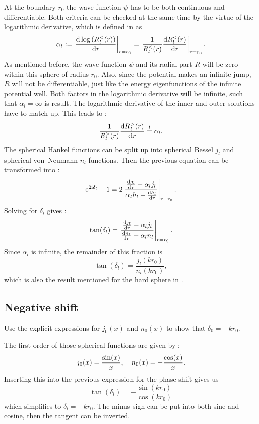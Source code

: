\documentclass[11pt, english, fleqn, DIV=15, headinclude, BCOR=1.5cm]{scrartcl}
\begin{document}
At the boundary $r_0$ the wave function $\psi$ has to be both continuous and
differentiable. Both criteria can be checked at the same time by the virtue of
the logarithmic derivative, which is defined in
\parencite[(18.60)]{Schwabl/Quantenmechanik} as
\[
    \alpha_l := \left. \frac{\mathop{}\!\mathrm d {\,\log\left( R_l^<(r) \right)}}{\mathop{}\!\mathrm d {r}} \right|_{r = r_0}
    = \left. \frac{1}{R_l^<(r)} \frac{\mathop{}\!\mathrm d {R_l^<(r)}}{\mathop{}\!\mathrm d {r}} \right|_{r = r_0}.
\]
As mentioned before, the wave function $\psi$ and its radial part $R$ will be
zero within this sphere of radius $r_0$. Also, since the potential makes an
infinite jump, $R$ will not be differentiable, just like the energy
eigenfunctions of the infinite potential well. Both factors in the logarithmic
derivative will be infinite, such that $\alpha_l = \infty$ is result. The
logarithmic derivative of the inner and outer solutions have to match up. This
leads to \parencite[(18.61)]{Schwabl/Quantenmechanik}:
\[
    \frac{1}{R_l^>(r)} \frac{\mathop{}\!\mathrm d {R_l^>(r)}}{\mathop{}\!\mathrm d {r}} \overset != \alpha_l.
\]
The spherical Hankel functions can be split up into spherical Bessel $j_l$ and
spherical von~Neumann $n_l$ functions. Then the previous equation can be
transformed into \parencite[(18.62)]{Schwabl/Quantenmechanik}:
\[
    \mathrm e^{2 \mathrm i \delta_l} -1 = 2 \left. \frac{\frac{\mathop{}\!\mathrm d {j_l}}{\mathop{}\!\mathrm d {r}} - \alpha_l j_l}{\alpha_l h_l
    - \frac{\mathop{}\!\mathrm d {h_l}}{\mathop{}\!\mathrm d {r}}} \right|_{r=r_0}.
\]
Solving for $\delta_l$ gives \parencite[(18.62)]{Schwabl/Quantenmechanik}:
\[
    \tan(\delta_l) = \left. \frac{\frac{\mathop{}\!\mathrm d {j_l}}{\mathop{}\!\mathrm d {r}} - \alpha_l j_l}{\frac{\mathop{}\!\mathrm d {n_l}}{\mathop{}\!\mathrm d {r}} - \alpha_l
    n_l} \right|_{r=r_0}.
\]
Since $\alpha_l$ is infinite, the remainder of this fraction is
\[
    \tan(\delta_l) = \frac{j_l(kr_0)}{n_l(kr_0)},
\]
which is also the result mentioned for the hard sphere in
\parencite[(18.63)]{Schwabl/Quantenmechanik}.

\subsection{Negative shift}

\begin{problem}
    Use the explicit expressions for $j_0(x)$ and $n_0(x)$ to show that
    $\delta_0 = - kr_0$.
\end{problem}

The first order of those spherical functions are given by
\parencite{MathWorld/BesselFunctionoftheSecondKind,MathWorld/BesselFunctionoftheFirstKind}:
\[
    j_0(x) = \frac{\sin(x)}{x}
    ,\quad
    n_0(x) = - \frac{\cos(x)}{x}.
\]
Inserting this into the previous expression for the phase shift gives us
\[
    \tan(\delta_l) = - \frac{\sin(kr_0)}{\cos(kr_0)}
\]
which simplifies to $\delta_l = - kr_0$. The minus sign can be put into both
sine and cosine, then the tangent can be inverted.
\end{document}
